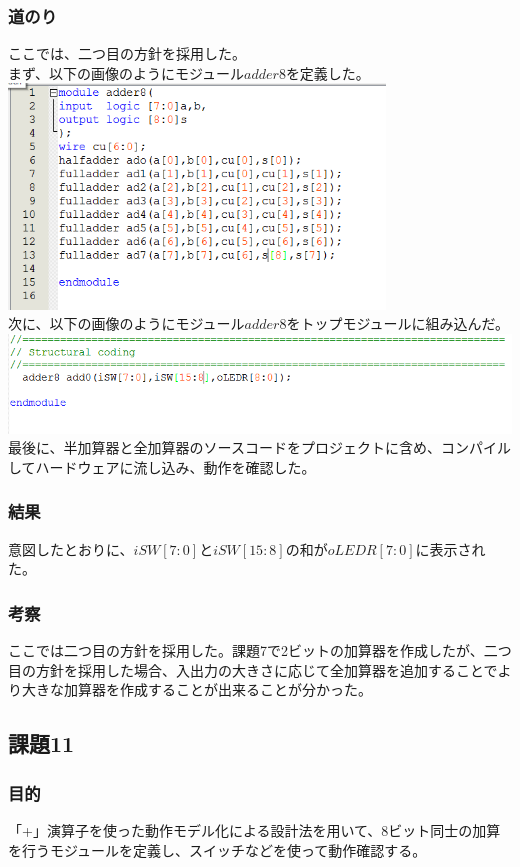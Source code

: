 \documentclass[a4paper]{jarticle}
\begin{document}
\subsubsection{道のり}
ここでは、二つ目の方針を採用した。\\
まず、以下の画像のようにモジュール$adder8$を定義した。\\
\includegraphics[width=10cm]{work10/10-2.PNG}\\
次に、以下の画像のようにモジュール$adder8$をトップモジュールに組み込んだ。\\
\includegraphics[width=15cm]{work10/10-1.PNG}\\
最後に、半加算器と全加算器のソースコードをプロジェクトに含め、コンパイルしてハードウェアに流し込み、動作を確認した。
\subsubsection{結果}
意図したとおりに、$iSW[7:0]$と$iSW[15:8]$の和が$oLEDR[7:0]$に表示された。
\subsubsection{考察}
ここでは二つ目の方針を採用した。課題7で2ビットの加算器を作成したが、二つ目の方針を採用した場合、入出力の大きさに応じて全加算器を追加することでより大きな加算器を作成することが出来ることが分かった。
\subsection{課題11}
\subsubsection{目的}
「+」演算子を使った動作モデル化による設計法を用いて、8ビット同士の加算を行うモジュールを定義し、スイッチなどを使って動作確認する。
\end{document}
